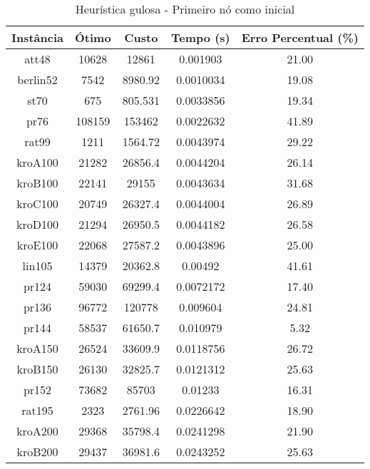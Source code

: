 
\begin{table}[H]
    \centering
    \begin{tabular}{|c|c|c|c|c|} \hline 
         \textbf{Instância} & \textbf{Ótimo} & \textbf{Custo} & \textbf{Tempo (s)} & \textbf{Erro Percentual (\%)} \\ \hline 
         att48       & 10628     & 12861    & 0.001903  & 21.00 \\ \hline
         berlin52    & 7542      & 8980.92  & 0.0010034 & 19.08 \\ \hline 
         st70        & 675       & 805.531  & 0.0033856 & 19.34 \\ \hline 
         pr76        & 108159    & 153462   & 0.0022632 & 41.89 \\ \hline 
         rat99       & 1211      & 1564.72  & 0.0043974 & 29.22 \\ \hline 
         kroA100     & 21282     & 26856.4  & 0.0044204 & 26.14 \\ \hline 
         kroB100     & 22141     & 29155    & 0.0043634 & 31.68 \\ \hline 
         kroC100     & 20749     & 26327.4  & 0.0044004 & 26.89 \\ \hline 
         kroD100     & 21294     & 26950.5  & 0.0044182 & 26.58 \\ \hline 
         kroE100     & 22068     & 27587.2  & 0.0043896 & 25.00 \\ \hline 
         lin105      & 14379     & 20362.8  & 0.00492   & 41.61 \\ \hline 
         pr124       & 59030     & 69299.4  & 0.0072172 & 17.40 \\ \hline 
         pr136       & 96772     & 120778   & 0.009604  & 24.81 \\ \hline 
         pr144       & 58537     & 61650.7  & 0.010979  & 5.32  \\ \hline 
         kroA150     & 26524     & 33609.9  & 0.0118756 & 26.72 \\ \hline 
         kroB150     & 26130     & 32825.7  & 0.0121312 & 25.63 \\ \hline 
         pr152       & 73682     & 85703    & 0.01233   & 16.31 \\ \hline          
         rat195      & 2323      & 2761.96  & 0.0226642 & 18.90 \\ \hline            
         kroA200     & 29368     & 35798.4  & 0.0241298 & 21.90 \\ \hline         
         kroB200     & 29437     & 36981.6  & 0.0243252 & 25.63 \\ \hline 
    \end{tabular}
    \caption{Heurística gulosa - Primeiro nó como inicial}
    \label{tab:my_label}
\end{table}

